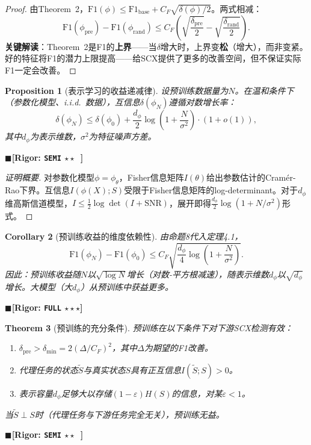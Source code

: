 \documentclass[12pt,a4paper]{ctexart}
\newtheorem{theorem}{Theorem}[section]
\newtheorem{proposition}[theorem]{Proposition}
\newtheorem{corollary}[theorem]{Corollary}
\theoremstyle{definition}
\theoremstyle{remark}
\newcommand{\rigorFull}{$\blacksquare$\;\textbf{[Rigor: \texttt{FULL} $\star\star\star$]}}
\newcommand{\rigorSemi}{$\blacksquare$\;\textbf{[Rigor: \texttt{SEMI} $\star\star\;\;$]}}
\begin{document}
\begin{proof}
由Theorem~2，$\mathrm{F1}(\phi) \leq \mathrm{F1}_{\text{base}} + C_F\sqrt{\delta(\phi)/2}$。两式相减：
\begin{equation}
\mathrm{F1}(\phi_{\text{pre}}) - \mathrm{F1}(\phi_{\text{rand}}) \leq C_F\left(\sqrt{\frac{\delta_{\text{pre}}}{2}} - \sqrt{\frac{\delta_{\text{rand}}}{2}}\right).
\end{equation}
\textbf{关键解读}：Theorem~2是F1的\textbf{上界}——当$\delta$增大时，上界变\textbf{松}（增大），而非变紧。好的特征将F1的潜力上限提高——给SCX提供了更多的改善空间，但不保证实际F1一定会改善。
\end{proof}

\begin{proposition}[表示学习的收益递减律]
\label{prop:8}
设预训练数据量为$N$。在温和条件下（参数化模型、i.i.d.\ 数据），互信息$\delta(\phi_N)$遵循对数增长率：
\begin{equation}
\delta(\phi_N) \leq \delta(\phi_0) + \frac{d_\phi}{2}\log\left(1 + \frac{N}{\sigma^2}\right) \cdot (1 + o(1)),
\end{equation}
其中$d_\phi$为表示维数，$\sigma^2$为特征噪声方差。
\end{proposition}
\rigorSemi

\begin{proof}[证明概要]
对参数化模型$\phi = \phi_\theta$，Fisher信息矩阵$I(\theta)$给出参数估计的Cram\'{e}r-Rao下界。互信息$I(\phi(X); S)$受限于Fisher信息矩阵的log-determinant。对于$d_\phi$维高斯信道模型，$I \leq \frac{1}{2}\log\det(I + \text{SNR})$，展开即得$\frac{d_\phi}{2}\log(1 + N/\sigma^2)$形式。
\end{proof}

\begin{corollary}[预训练收益的维度依赖性]
\label{cor:3}
由命题8代入定理4.1，
\begin{equation}
\mathrm{F1}(\phi_N) - \mathrm{F1}(\phi_0) \leq C_F\sqrt{\frac{d_\phi}{4}\log\left(1 + \frac{N}{\sigma^2}\right)}.
\end{equation}
因此：预训练收益随$N$以$\sqrt{\log N}$增长（对数-平方根减速），随表示维数$d_\phi$以$\sqrt{d_\phi}$增长。大模型（大$d_\phi$）从预训练中获益更多。
\end{corollary}
\rigorFull

\begin{theorem}[预训练的充分条件]
\label{thm:4.2}
预训练在以下条件下对下游SCX检测有效：
\begin{enumerate}[label=\arabic*.]
\item $\delta_{\text{pre}} > \delta_{\min} = 2(\Delta/C_F)^2$，其中$\Delta$为期望的F1改善。
\item 代理任务的状态$\tilde{S}$与真实状态$S$具有正互信息$I(\tilde{S}; S) > 0$。
\item 表示容量$d_\phi$足够大以存储$(1-\varepsilon)H(S)$的信息，对某$\varepsilon < 1$。
\end{enumerate}
当$\tilde{S} \perp S$时（代理任务与下游任务完全无关），预训练无益。
\end{theorem}
\rigorSemi
\end{document}
